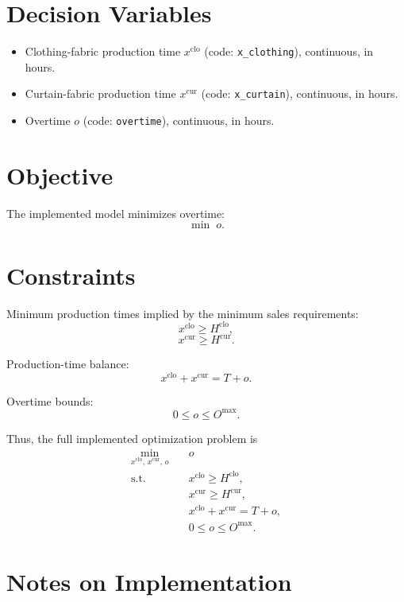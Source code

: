 \section*{Decision Variables}

\begin{itemize}
    \item Clothing-fabric production time $x^{\mathrm{clo}}$ (code: \texttt{x\_clothing}), continuous, in hours.
    \item Curtain-fabric production time $x^{\mathrm{cur}}$ (code: \texttt{x\_curtain}), continuous, in hours.
    \item Overtime $o$ (code: \texttt{overtime}), continuous, in hours.
\end{itemize}

\section*{Objective}

The implemented model minimizes overtime:
\[
\min \; o.
\]

\section*{Constraints}

Minimum production times implied by the minimum sales requirements:
\[
x^{\mathrm{clo}} \ge H^{\mathrm{clo}},
\]
\[
x^{\mathrm{cur}} \ge H^{\mathrm{cur}}.
\]

Production-time balance:
\[
x^{\mathrm{clo}} + x^{\mathrm{cur}} = T + o.
\]

Overtime bounds:
\[
0 \le o \le O^{\max}.
\]

Thus, the full implemented optimization problem is
\[
\begin{aligned}
\min_{x^{\mathrm{clo}},\,x^{\mathrm{cur}},\,o}\quad & o \\
\text{s.t.}\quad
& x^{\mathrm{clo}} \ge H^{\mathrm{clo}},\\
& x^{\mathrm{cur}} \ge H^{\mathrm{cur}},\\
& x^{\mathrm{clo}} + x^{\mathrm{cur}} = T + o,\\
& 0 \le o \le O^{\max}.
\end{aligned}
\]

\section*{Notes on Implementation}

